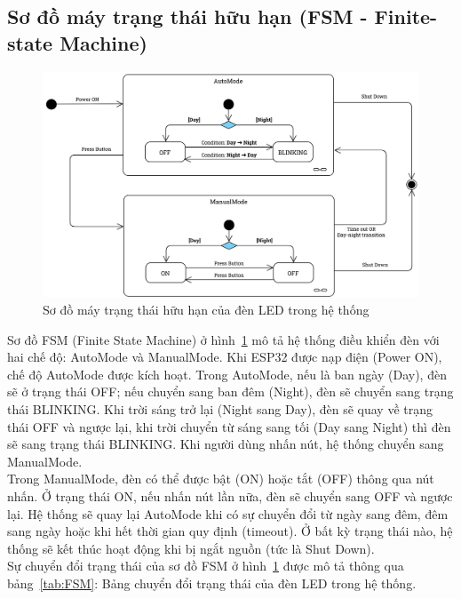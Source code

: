 {\subsection{Sơ đồ máy trạng thái hữu hạn (FSM - Finite-state Machine)}
\begin{figure}[H]
    \centering
    \includegraphics[scale=0.16]{img/FSM-2.jpg}
    \caption{Sơ đồ máy trạng thái hữu hạn của đèn LED trong hệ thống}
    \label{fig:FSM}
\end{figure}

Sơ đồ FSM (Finite State Machine) ở hình~\ref{fig:FSM}  mô tả hệ thống điều khiển đèn với hai chế độ: AutoMode và ManualMode. Khi ESP32 được nạp điện (Power ON), chế độ AutoMode được kích hoạt. Trong AutoMode, nếu là ban ngày (Day), đèn sẽ ở trạng thái OFF; nếu chuyển sang ban đêm (Night), đèn sẽ chuyển sang trạng thái BLINKING. Khi trời sáng trở lại (Night sang Day), đèn sẽ quay về trạng thái OFF và ngược lại, khi trời chuyển từ sáng sang tối (Day sang Night) thì đèn sẽ sang trạng thái BLINKING. Khi người dùng nhấn nút, hệ thống chuyển sang ManualMode.\\

Trong ManualMode, đèn có thể được bật (ON) hoặc tắt (OFF) thông qua nút nhấn. Ở trạng thái ON, nếu nhấn nút lần nữa, đèn sẽ chuyển sang OFF và ngược lại. Hệ thống sẽ quay lại AutoMode khi có sự chuyển đổi từ ngày sang đêm, đêm sang ngày hoặc khi hết thời gian quy định (timeout). Ở bất kỳ trạng thái nào, hệ thống sẽ kết thúc hoạt động khi bị ngắt nguồn (tức là Shut Down).\\

Sự chuyển đổi trạng thái của sơ đồ FSM ở hình~\ref{fig:FSM} được mô tả thông qua bảng~\ref{tab:FSM}: Bảng chuyển đổi trạng thái của đèn LED trong hệ thống. 

\begin{table}[H]
\centering
\small
\begin{tabular}{|p{2.3cm}|p{3cm}|p{4cm}|p{2cm}|p{4cm}|}
\hline


\end{tabular}
\end{table}}
